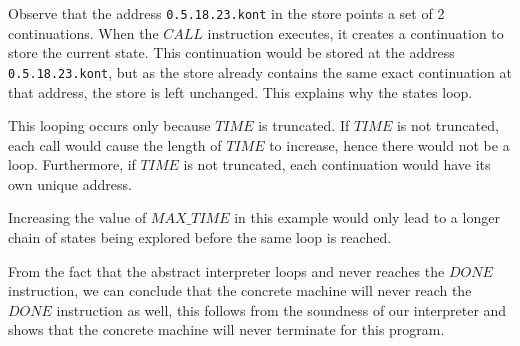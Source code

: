\documentclass[12pt]{article}
\begin{document}
Observe that the address \verb|0.5.18.23.kont| in the store points a set of 2 continuations. When the $CALL$ instruction executes, it creates a continuation to store the current state. This continuation would be stored at the address \verb|0.5.18.23.kont|, but as the store already contains the same exact continuation at that address, the store is left unchanged. This explains why the states loop.

This looping occurs only because $TIME$ is truncated. If $TIME$ is not truncated, each call would cause the length of $TIME$ to increase, hence there would not be a loop. Furthermore, if $TIME$ is not truncated, each continuation would have its own unique address.

Increasing the value of $MAX\_TIME$ in this example would only lead to a longer chain of states being explored before the same loop is reached.

From the fact that the abstract interpreter loops and never reaches the $DONE$ instruction, we can conclude that the concrete machine will never reach the $DONE$ instruction as well, this follows from the soundness of our interpreter and shows that the concrete machine will never terminate for this program.
\end{document}
